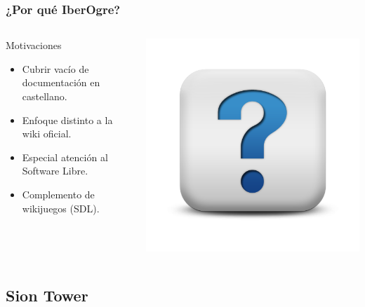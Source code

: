 \documentclass[green]{beamer}
\begin{document}
\begin{frame}
\transdissolve
	\frametitle{¿Por qué IberOgre?}
    
    \begin{columns}[c]
    \column{200pt}
        
	\begin{block}{Motivaciones}
            \begin{itemize}
                \item Cubrir vacío de documentación en castellano.
                \item Enfoque distinto a la wiki oficial.
		\item Especial atención al Software Libre.
		\item Complemento de wikijuegos (SDL).
            \end{itemize}            
        \end{block}

    \column{100pt}
	\begin{center}
	    \includegraphics[scale=0.2]{img/question.png}
	\end{center}
    \end{columns} 
\end{frame}

\subsection{Sion Tower}
\end{document}

